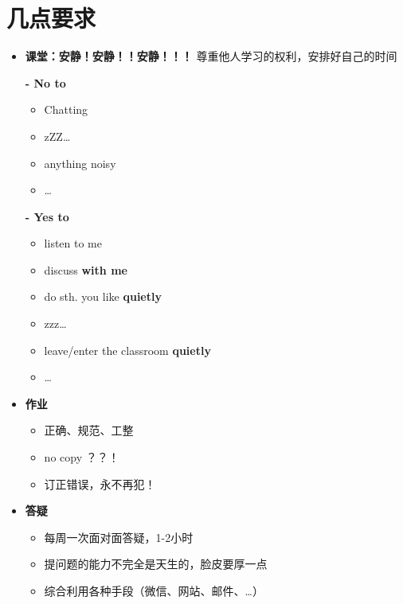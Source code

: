 \section{几点要求}
\begin{itemize}
	\item {\bf 课堂：安静！安静！！安静！！！}
	尊重他人学习的权利，安排好自己的时间
	
	{\bf - No to}
	  \begin{itemize}
	    \item Chatting
	    \item zZZ\ldots
	    \item anything noisy
	    \item \ldots
	  \end{itemize}
	{\bf - Yes to}
  \begin{itemize}
    \item listen to me
    \item discuss {\bf with me}
    \item do sth. you like {\bf quietly}
    \item zzz\ldots
    \item leave/enter the classroom {\bf quietly}
    \item \ldots
  \end{itemize}
  \item {\bf 作业}
  \begin{itemize}
    \item 正确、规范、工整
    \item no copy ？？！
    \item 订正错误，永不再犯！
  \end{itemize}
	\item {\bf 答疑}
	  \begin{itemize}
	    \item 每周一次面对面答疑，1-2小时
	    \item 提问题的能力不完全是天生的，脸皮要厚一点
	    \item 综合利用各种手段（微信、网站、邮件、\ldots）
	  \end{itemize}
\end{itemize}

\newpage

